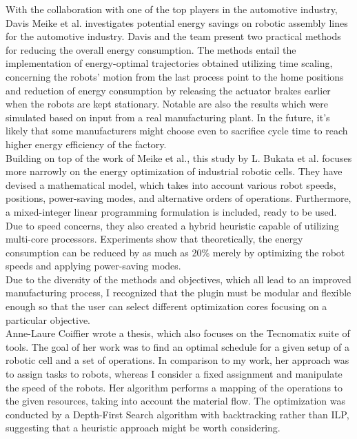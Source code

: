 With the collaboration with one of the top players in the automotive industry, Davis Meike et al. \cite{Meike8Percent} investigates potential energy savings on robotic assembly lines for the automotive industry. Davis and the team present two practical methods for reducing the overall energy consumption. The methods entail the implementation of energy-optimal trajectories obtained utilizing time scaling, concerning the robots' motion from the last process point to the home positions and reduction of energy consumption by releasing the actuator brakes earlier when the robots are kept stationary. Notable are also the results which were simulated based on input from a real manufacturing plant. In the future, it's likely that some manufacturers might choose even to sacrifice cycle time to reach higher energy efficiency of the factory. \\

Building on top of the work of Meike et al., this study by L. Bukata et al. \cite{EnergyOptimisationBukata} focuses more narrowly on the energy optimization of industrial robotic cells. They have devised a mathematical model, which takes into account various robot speeds, positions, power-saving modes, and alternative orders of operations. Furthermore, a mixed-integer linear programming formulation is included, ready to be used. Due to speed concerns, they also created a hybrid heuristic capable of utilizing multi-core processors. Experiments show that theoretically, the energy consumption can be reduced by as much as 20\% merely by optimizing the robot speeds and applying power-saving modes. \\

Due to the diversity of the methods and objectives, which all lead to an improved manufacturing process, I recognized that the plugin must be modular and flexible enough so that the user can select different optimization cores focusing on a particular objective. \\

Anne-Laure Coiffier \cite{AnneBacktracking} wrote a thesis, which also focuses on the Tecnomatix suite of tools. The goal of her work was to find an optimal schedule for a given setup of a robotic cell and a set of operations. In comparison to my work, her approach was to assign tasks to robots, whereas I consider a fixed assignment and manipulate the speed of the robots. Her algorithm performs a mapping of the operations to the given resources, taking into account the material flow. The optimization was conducted by a Depth-First Search algorithm with backtracking rather than ILP, suggesting that a heuristic approach might be worth considering. \\


